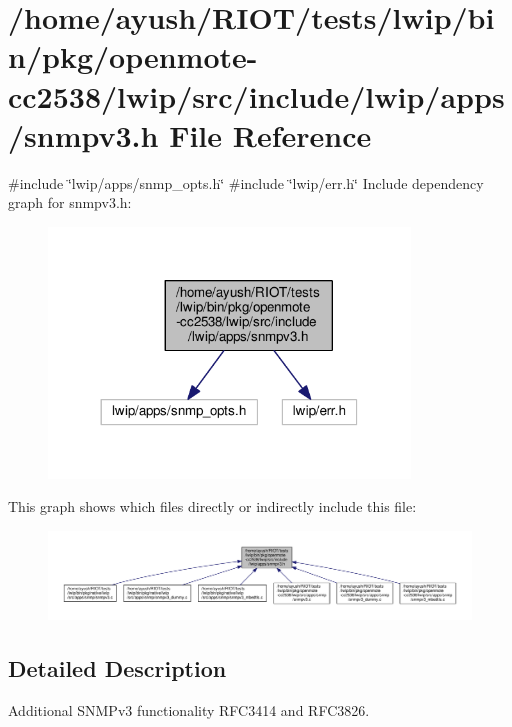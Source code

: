 \hypertarget{openmote-cc2538_2lwip_2src_2include_2lwip_2apps_2snmpv3_8h}{}\section{/home/ayush/\+R\+I\+O\+T/tests/lwip/bin/pkg/openmote-\/cc2538/lwip/src/include/lwip/apps/snmpv3.h File Reference}
\label{openmote-cc2538_2lwip_2src_2include_2lwip_2apps_2snmpv3_8h}
{\ttfamily \#include \char`\"{}lwip/apps/snmp\+\_\+opts.\+h\char`\"{}}\newline
{\ttfamily \#include \char`\"{}lwip/err.\+h\char`\"{}}\newline
Include dependency graph for snmpv3.\+h\+:
\nopagebreak
\begin{figure}[H]
\begin{center}
\leavevmode
\includegraphics[width=272pt]{openmote-cc2538_2lwip_2src_2include_2lwip_2apps_2snmpv3_8h__incl}
\end{center}
\end{figure}
This graph shows which files directly or indirectly include this file\+:
\nopagebreak
\begin{figure}[H]
\begin{center}
\leavevmode
\includegraphics[width=350pt]{openmote-cc2538_2lwip_2src_2include_2lwip_2apps_2snmpv3_8h__dep__incl}
\end{center}
\end{figure}


\subsection{Detailed Description}
Additional S\+N\+M\+Pv3 functionality R\+F\+C3414 and R\+F\+C3826. 